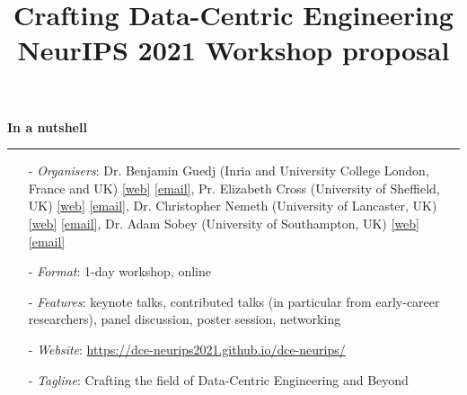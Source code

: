 \documentclass[11pt,a4paper]{scrartcl}
\theoremstyle{plain}  %
\begin{document}
\title{Crafting Data-Centric Engineering\\NeurIPS 2021 Workshop proposal}

\author{
}
\date{}

\maketitle



\vspace{-1cm}
\begin{tcolorbox}[colframe=black!25, colback=black!2] \vspace{-5pt}
\begin{center}
\textbf{In a nutshell}
\end{center}
\vspace{-9pt}
\hrule
\noindent
\vspace{3pt}
\begin{itemize}
  \item[-] \textit{Organisers}: Dr. Benjamin Guedj (Inria and University College London, France and UK) \href{https://bguedj.github.io}{[web]} \href{mailto:benjamin.guedj@inria.fr}{[email]},
  Pr. Elizabeth Cross (University of Sheffield, UK) \href{https://www.sheffield.ac.uk/mecheng/people/academic/elizabeth-cross}{[web]} \href{mailto:e.j.cross@sheffield.ac.uk}{[email]},
  Dr. Christopher Nemeth (University of Lancaster, UK) \href{http://www.lancs.ac.uk/~nemeth/}{[web]} \href{mailto:c.nemeth@lancaster.ac.uk}{[email]},
  Dr. Adam Sobey (University of Southampton, UK) \href{https://www.southampton.ac.uk/engineering/about/staff/ajs502.page}{[web]} \href{mailto:ajs502@soton.ac.uk}{[email]}
\item[-] \textit{Format}: 1-day workshop, online
\item[-] \textit{Features}: keynote talks, contributed talks (in particular from early-career researchers), panel discussion, poster session, networking
\item[-] \textit{Website}: \url{https://dce-neurips2021.github.io/dce-neurips/}
\item[-] \textit{Tagline}: Crafting the field of Data-Centric Engineering and Beyond 
\end{itemize}
\end{tcolorbox}
\end{document}
